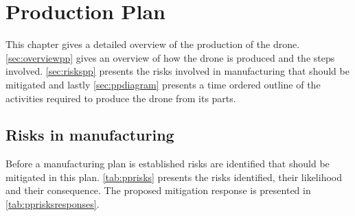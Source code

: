 \chapter{Production Plan}
\label{ch:productionplan}

This chapter gives a detailed overview of the production of the drone.\autoref{sec:overviewpp} gives an overview of how the drone is produced and the steps involved. \autoref{sec:riskspp} presents the risks involved in manufacturing that should be mitigated and lastly \autoref{sec:ppdiagram} presents a time ordered outline of the activities required to produce the drone from its parts.

\section{Risks in manufacturing}\label{sec:riskspp}
Before a manufacturing plan is established risks are identified that should be mitigated in this plan. \autoref{tab:pprisks} presents the risks identified, their likelihood and their consequence. The proposed mitigation response is presented in \autoref{tab:pprisksresponses}.

